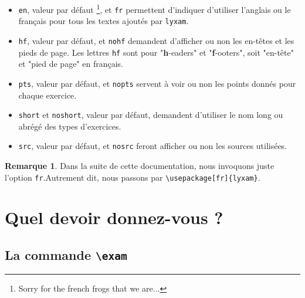 \documentclass[12pt,a4paper]{scrartcl}
\theoremstyle{definition}
\newtheorem*{remark}{Remarque}
\begin{document}
\begin{itemize}[label=\textbullet]

	\item \verb+en+, valeur par défaut
	\footnote{
		Sorry for the french frogs that we are...
	}, et \verb+fr+ permettent d'indiquer d'utiliser l'anglais ou le français pour tous les textes ajoutés par \verb+lyxam+.

	\item \verb+hf+, valeur par défaut, et \verb+nohf+ demandent d'afficher ou non les en-têtes et les pieds de page.
	Les lettres \verb+hf+ sont pour "\textbf{h}-eaders" et "\textbf{f}-ooters", soit "en-tête" et "pied de page" en français.

	\item \verb+pts+, valeur par défaut, et \verb+nopts+ servent à voir ou non les points donnés pour chaque exercice.

	\item \verb+short+ et \verb+noshort+, valeur par défaut, demandent d'utiliser le nom long ou abrégé des types d'exercices.

	\item \verb+src+, valeur par défaut, et \verb+nosrc+ feront afficher ou non les sources utilisées.
\end{itemize}

\begin{remark}
	Dans la suite de cette documentation, nous invoquons juste l'option \verb+fr+.Autrement dit, nous passons par \verb+\usepackage[fr]{lyxam}+.
\end{remark}




\section{Quel devoir donnez-vous ?}

	\subsection{La commande \texttt{\textbackslash exam}}
\end{document}
